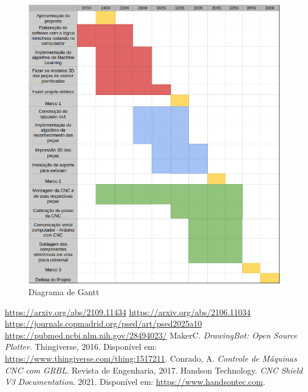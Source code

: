 \documentclass[a4paper,12pt]{article}
\begin{document}
\vspace{1em}  

\begin{figure}[H]  
    \centering  
    \includegraphics[width=1\textwidth]{images/cronograma2.jpg}   
    \caption{Diagrama de Gantt}  
    \label{fig:cronograma_projeto}  
\end{figure}  

\vspace{1em}  

\begin{thebibliography}{9}  
 \href{https://arxiv.org/abs/2109.11434}{https://arxiv.org/abs/2109.11434}  
 \href{https://arxiv.org/abs/2106.11034}{https://arxiv.org/abs/2106.11034}  
 \href{https://journals.copmadrid.org/psed/art/psed2025a10}{https://journals.copmadrid.org/psed/art/psed2025a10}  
 \href{https://pubmed.ncbi.nlm.nih.gov/28494023/}{https://pubmed.ncbi.nlm.nih.gov/28494023/}  
 MakerC. \textit{DrawingBot: Open Source Plotter}. Thingiverse, 2016. Disponível em: \url{https://www.thingiverse.com/thing:1517211}.  
 Conrado, A. \textit{Controle de Máquinas CNC com GRBL}. Revista de Engenharia, 2017.  
 Handson Technology. \textit{CNC Shield V3 Documentation}. 2021. Disponível em: \url{https://www.handsontec.com}.  
\end{thebibliography}  
\end{document}
